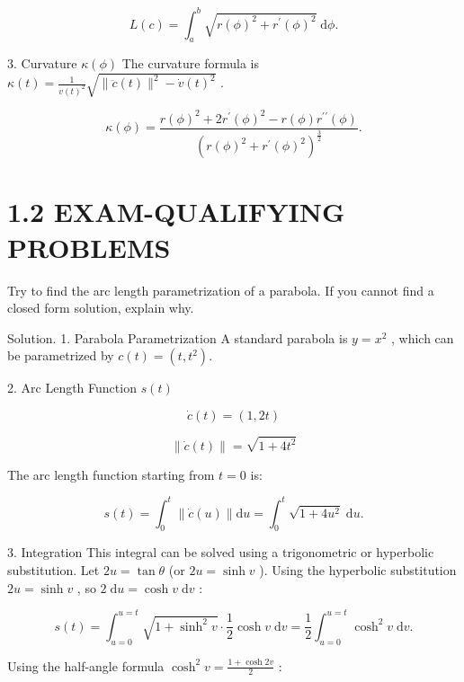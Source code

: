 \documentclass[10pt]{article}
\begin{document}
\[
L\left( c\right)  = {\int }_{a}^{b}\sqrt{r{\left( \phi \right) }^{2} + {r}^{\prime }{\left( \phi \right) }^{2}}\mathrm{\;d}\phi .
\]

3. Curvature \(\kappa \left( \phi \right)\) The curvature formula is \(\kappa \left( t\right)  = \frac{1}{v{\left( t\right) }^{2}}\sqrt{\parallel \ddot{c}\left( t\right) {\parallel }^{2} - \dot{v}{\left( t\right) }^{2}}\) .

\[
\kappa \left( \phi \right)  = \frac{r{\left( \phi \right) }^{2} + 2{r}^{\prime }{\left( \phi \right) }^{2} - r\left( \phi \right) {r}^{\prime \prime }\left( \phi \right) }{{\left( r{\left( \phi \right) }^{2} + {r}^{\prime }{\left( \phi \right) }^{2}\right) }^{\frac{3}{2}}}.
\]

\section*{1.2 EXAM-QUALIFYING PROBLEMS}

\begin{problem}[title=PROBLEM 4 (4 POINTS)]
Try to find the arc length parametrization of a parabola. If you cannot find a closed form solution, explain why.
\end{problem}

Solution. 1. Parabola Parametrization A standard parabola is \(y = {x}^{2}\) , which can be parametrized by \(c\left( t\right)  = \left( {t,{t}^{2}}\right) .\)

2. Arc Length Function \(s\left( t\right)\)

\[
\dot{c}\left( t\right)  = \left( {1,{2t}}\right)
\]

\[
\parallel \dot{c}\left( t\right) \parallel  = \sqrt{1 + 4{t}^{2}}
\]

The arc length function starting from \(t = 0\) is:

\[
s\left( t\right)  = {\int }_{0}^{t}\parallel \dot{c}\left( u\right) \parallel \mathrm{d}u = {\int }_{0}^{t}\sqrt{1 + 4{u}^{2}}\mathrm{\;d}u.
\]

3. Integration This integral can be solved using a trigonometric or hyperbolic substitution. Let \({2u} = \tan \theta\) (or \({2u} = \sinh v\) ). Using the hyperbolic substitution \({2u} = \sinh v\) , so \(2\mathrm{\;d}u = \cosh v\mathrm{\;d}v\) :

\[
s\left( t\right)  = {\int }_{u = 0}^{u = t}\sqrt{1 + {\sinh }^{2}v} \cdot  \frac{1}{2}\cosh v\mathrm{\;d}v = \frac{1}{2}{\int }_{u = 0}^{u = t}{\cosh }^{2}v\mathrm{\;d}v.
\]

Using the half-angle formula \({\cosh }^{2}v = \frac{1 + \cosh {2v}}{2}\) :
\end{document}
